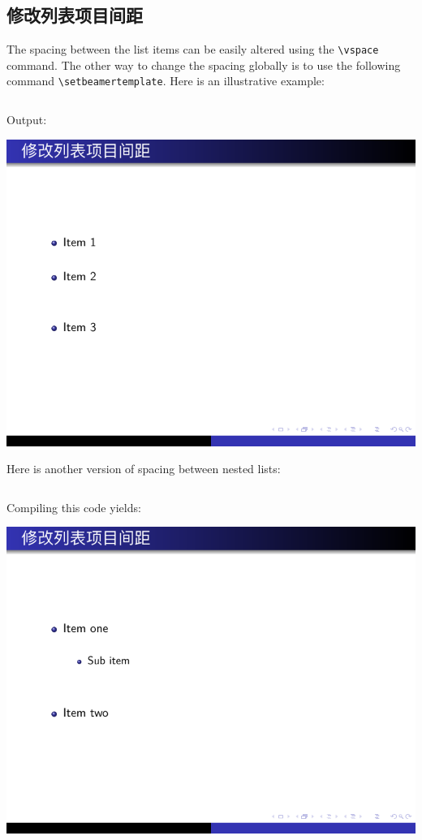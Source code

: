 \subsection{修改列表项目间距}

The spacing between the list items can be easily altered using the \verb|\vspace| command. The other way to change the spacing globally is to use the following command \verb|\setbeamertemplate|. Here is an illustrative example:

\inputminted[linenos=true]{latex}{examples/beamer/beamerlist05.tex}

Output:

\includegraphics{examples/beamer/beamerlist05.pdf}

Here is another version of spacing between nested lists:

\inputminted[linenos=true]{latex}{examples/beamer/beamerlist06.tex}

Compiling this code yields:

\includegraphics{examples/beamer/beamerlist06.pdf}

